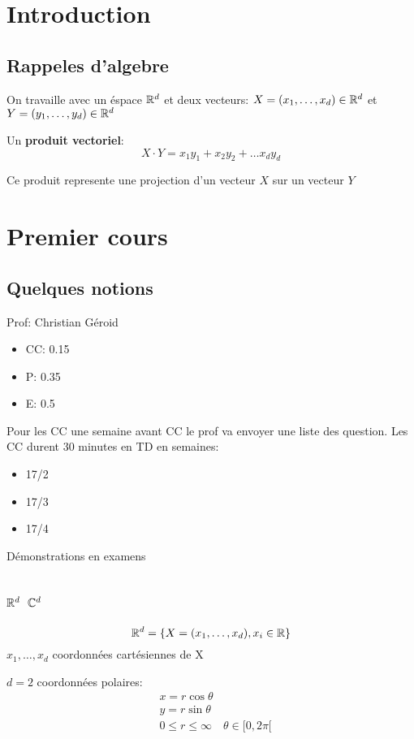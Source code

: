 \documentclass[a4paper]{report}
\begin{document}
\chapter{Introduction}
\section{Rappeles d'algebre}
On travaille avec un éspace $\mathbb{R}^d$ et deux vecteurs:  $X = (x_1, \ldots, x_d) \in \mathbb{R}^d$ et $Y = (y_1, \ldots, y_d) \in \mathbb{R}^d$
\begin{definition}
    Un \textbf{produit vectoriel}:
    \[
    X \cdot Y = x_1y_1 + x_2y_2 + \ldots x_dy_d
    \] 
\end{definition}
\begin{intuition}
   Ce produit represente une projection d'un vecteur $X$ sur un vecteur  $Y$ 
   \begin{center}
   \end{center}
\end{intuition}
\chapter{Premier cours}
\section{Quelques notions}
Prof: Christian Géroid
\begin{itemize}
    \item CC: 0.15
    \item P: 0.35
    \item E: 0.5
\end{itemize}
Pour les CC une semaine avant CC le prof va envoyer une liste des question. Les CC durent 30 minutes en TD en semaines:
\begin{itemize}
    \item 17/2
    \item 17/3
    \item 17/4
\end{itemize}
Démonstrations en examens
\section{$\mathbb{R}^d$  $\mathbb{C}^d$}
\[
    \mathbb{R}^d = \{ X = (x_1, \ldots, x_d), x_i \in \mathbb{R}\}
\] 
$x_1, \ldots, x_d$ coordonnées cartésiennes de X
\begin{eg}
   $d = 2$ coordonnées polaires:  
   \begin{align*}
      &x = r \cos \theta \\
        & y = r \sin \theta\\
        &0 \le r \le  \infty \quad \theta \in [0, 2\pi[
   \end{align*}
\end{eg}
\end{document}
